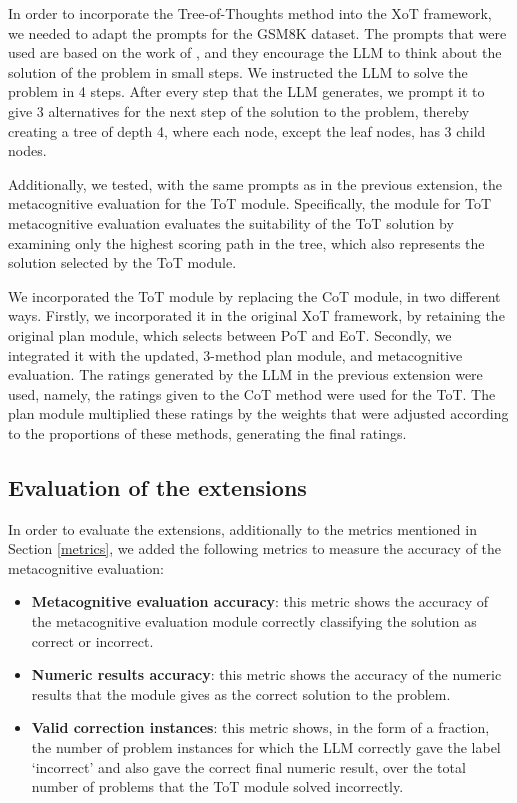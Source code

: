 \documentclass[10pt]{article} %
\begin{document}
In order to incorporate the Tree-of-Thoughts method into the XoT framework, we needed to adapt the prompts for the GSM8K dataset. The prompts that were used are based on the work of \cite{pandit2023tree}, and they encourage the LLM to think about the solution of the problem in small steps. We instructed the LLM to solve the problem in 4 steps. After every step that the LLM generates, we prompt it to give 3 alternatives for the next step of the solution to the problem, thereby creating a tree of depth 4, where each node, except the leaf nodes, has 3 child nodes.

Additionally, we tested, with the same prompts as in the previous extension, the metacognitive evaluation for the ToT module. Specifically, the module for ToT metacognitive evaluation evaluates the suitability of the ToT solution by examining only the highest scoring path in the tree, which also represents the solution selected by the ToT module.

We incorporated the ToT module by replacing the CoT module, in two different ways. Firstly, we incorporated it in the original XoT framework, by retaining the original plan module, which selects between PoT and EoT.  Secondly, we integrated it with the updated, 3-method plan module, and metacognitive evaluation. The ratings generated by the LLM in the previous extension were used, namely, the ratings given to the CoT method were used for the ToT. The plan module multiplied these ratings by the weights that were adjusted according to the proportions of these methods, generating the final ratings.

\subsection{Evaluation of the extensions}

In order to evaluate the extensions, additionally to the metrics mentioned in Section \ref{metrics}, we added the following metrics to measure the accuracy of the metacognitive evaluation:

\begin{itemize}  
  \item \textbf{Metacognitive evaluation accuracy}: this metric shows the accuracy of the metacognitive evaluation module correctly classifying the solution as correct or incorrect.
  \item \textbf{Numeric results accuracy}: this metric shows the accuracy of the numeric results that the module gives as the correct solution to the problem.  
  \item \textbf{Valid correction instances}: this metric shows, in the form of a fraction, the number of problem instances for which the LLM correctly gave the label `incorrect' and also gave the correct final numeric result, over the total number of problems that the ToT module solved incorrectly.
\end{itemize}
\end{document}
